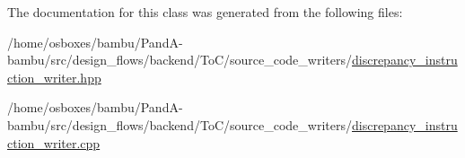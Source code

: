 The documentation for this class was generated from the following files\+:\begin{DoxyCompactItemize}
\item 
/home/osboxes/bambu/\+Pand\+A-\/bambu/src/design\+\_\+flows/backend/\+To\+C/source\+\_\+code\+\_\+writers/\hyperlink{discrepancy__instruction__writer_8hpp}{discrepancy\+\_\+instruction\+\_\+writer.\+hpp}\item 
/home/osboxes/bambu/\+Pand\+A-\/bambu/src/design\+\_\+flows/backend/\+To\+C/source\+\_\+code\+\_\+writers/\hyperlink{discrepancy__instruction__writer_8cpp}{discrepancy\+\_\+instruction\+\_\+writer.\+cpp}\end{DoxyCompactItemize}
